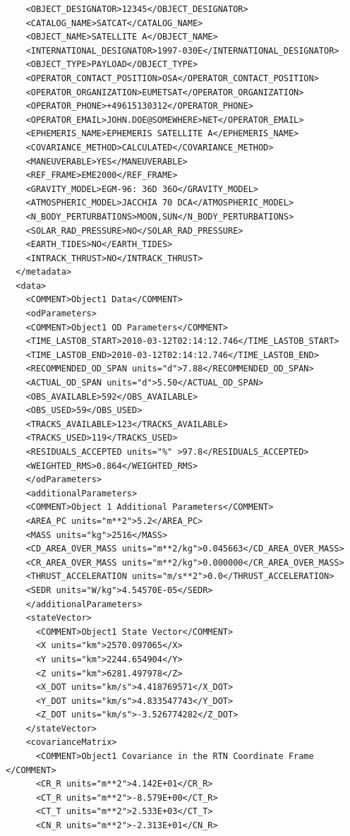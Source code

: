 \begin{lstlisting}
    <OBJECT_DESIGNATOR>12345</OBJECT_DESIGNATOR>
    <CATALOG_NAME>SATCAT</CATALOG_NAME>
    <OBJECT_NAME>SATELLITE A</OBJECT_NAME>
    <INTERNATIONAL_DESIGNATOR>1997-030E</INTERNATIONAL_DESIGNATOR>
    <OBJECT_TYPE>PAYLOAD</OBJECT_TYPE>
    <OPERATOR_CONTACT_POSITION>OSA</OPERATOR_CONTACT_POSITION>
    <OPERATOR_ORGANIZATION>EUMETSAT</OPERATOR_ORGANIZATION>
    <OPERATOR_PHONE>+49615130312</OPERATOR_PHONE>
    <OPERATOR_EMAIL>JOHN.DOE@SOMEWHERE>NET</OPERATOR_EMAIL>
    <EPHEMERIS_NAME>EPHEMERIS SATELLITE A</EPHEMERIS_NAME>
    <COVARIANCE_METHOD>CALCULATED</COVARIANCE_METHOD>
    <MANEUVERABLE>YES</MANEUVERABLE>
    <REF_FRAME>EME2000</REF_FRAME>
    <GRAVITY_MODEL>EGM-96: 36D 36O</GRAVITY_MODEL>
    <ATMOSPHERIC_MODEL>JACCHIA 70 DCA</ATMOSPHERIC_MODEL>
    <N_BODY_PERTURBATIONS>MOON,SUN</N_BODY_PERTURBATIONS>
    <SOLAR_RAD_PRESSURE>NO</SOLAR_RAD_PRESSURE>
    <EARTH_TIDES>NO</EARTH_TIDES>
    <INTRACK_THRUST>NO</INTRACK_THRUST>
  </metadata>
  <data>
    <COMMENT>Object1 Data</COMMENT>
    <odParameters>
    <COMMENT>Object1 OD Parameters</COMMENT>
    <TIME_LASTOB_START>2010-03-12T02:14:12.746</TIME_LASTOB_START>
    <TIME_LASTOB_END>2010-03-12T02:14:12.746</TIME_LASTOB_END>
    <RECOMMENDED_OD_SPAN units="d">7.88</RECOMMENDED_OD_SPAN>
    <ACTUAL_OD_SPAN units="d">5.50</ACTUAL_OD_SPAN>
    <OBS_AVAILABLE>592</OBS_AVAILABLE>
    <OBS_USED>59</OBS_USED>
    <TRACKS_AVAILABLE>123</TRACKS_AVAILABLE>
    <TRACKS_USED>119</TRACKS_USED>
    <RESIDUALS_ACCEPTED units="%" >97.8</RESIDUALS_ACCEPTED>
    <WEIGHTED_RMS>0.864</WEIGHTED_RMS>
    </odParameters>
    <additionalParameters>
    <COMMENT>Object 1 Additional Parameters</COMMENT>
    <AREA_PC units="m**2">5.2</AREA_PC>
    <MASS units="kg">2516</MASS>
    <CD_AREA_OVER_MASS units="m**2/kg">0.045663</CD_AREA_OVER_MASS>
    <CR_AREA_OVER_MASS units="m**2/kg">0.000000</CR_AREA_OVER_MASS>
    <THRUST_ACCELERATION units="m/s**2">0.0</THRUST_ACCELERATION>
    <SEDR units="W/kg">4.54570E-05</SEDR>
    </additionalParameters>
    <stateVector>
      <COMMENT>Object1 State Vector</COMMENT>
      <X units="km">2570.097065</X>
      <Y units="km">2244.654904</Y>
      <Z units="km">6281.497978</Z>
      <X_DOT units="km/s">4.418769571</X_DOT>
      <Y_DOT units="km/s">4.833547743</Y_DOT>
      <Z_DOT units="km/s">-3.526774282</Z_DOT>
    </stateVector>
    <covarianceMatrix>
      <COMMENT>Object1 Covariance in the RTN Coordinate Frame </COMMENT>
      <CR_R units="m**2">4.142E+01</CR_R>
      <CT_R units="m**2">-8.579E+00</CT_R>
      <CT_T units="m**2">2.533E+03</CT_T>
      <CN_R units="m**2">-2.313E+01</CN_R>

\end{lstlisting}
